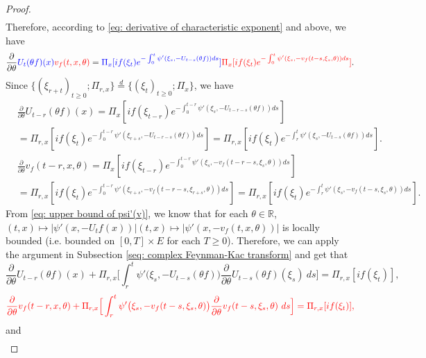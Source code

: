 \documentclass[12pt,oneside,english]{amsart}
\theoremstyle{plain}
\theoremstyle{definition}
\numberwithin{equation}{section}
\newcommand{\added}[1]{{\color{blue}#1}}\newcommand{\deleted}[1]{{\color{red}#1}}
\begin{document}
\begin{proof}
\begin{align}
\end{align}
    Therefore, according to \eqref{eq: derivative of characteristic exponent} and above, we have
\begin{align}
    \frac{\partial}{\partial \theta} \added{U_t(\theta f)(x)}\deleted{v_f(t, x, \theta) }   
    = \added{ \Pi_x[ if(\xi_t) e^{ - \int_0^t \psi'(\xi_s, -U_{t-s}(\theta f)) ds} ]}\deleted{ \Pi_x[ if(\xi_t) e^{ - \int_0^t \psi'(\xi_s, -v_f(t-s,\xi_s,\theta)) ds} ]}.
\end{align}
    Since $\{(\xi_{r+t})_{t \geq 0}; \Pi_{r,x}\} \overset{d}{=} \{(\xi_{t})_{t\geq 0}; \Pi_{x}\} $, we have
\deleted{
\begin{align}
    &\frac{\partial}{\partial \theta} U_{t-r}(\theta f)( x)
    = \Pi_x[ i f(\xi_{t-r}) e^{-\int_0^{t-r} \psi'(\xi_s, -U_{t-r-s}(\theta f)) ds} ]
    \\&= \Pi_{r,x}[i f(\xi_t)e^{-\int_0^{t-r} \psi'(\xi_{r+s}, -U_{t-r-s}(\theta f)) ds} ]
    = \Pi_{r,x}[if(\xi_t)e^{-\int_r^t \psi'(\xi_{s}, -U_{t-s}(\theta f)) ds} ].
\end{align}}
\deleted{
\begin{align}
    &\frac{\partial}{\partial \theta} v_f(t - r, x, \theta)
    = \Pi_x[ if(\xi_{t-r}) e^{-\int_0^{t-r} \psi'(\xi_s, -v_f(t-r-s,\xi_s,\theta)) ds} ]
    \\&= \Pi_{r,x}[if(\xi_t)e^{-\int_0^{t-r} \psi'(\xi_{r+s}, -v_f(t-r-s,\xi_{r+s},\theta)) ds} ]
    = \Pi_{r,x}[if(\xi_t)e^{-\int_r^t \psi'(\xi_{s}, -v_f(t-s,\xi_{s},\theta)) ds} ].
\end{align}
}
    From \eqref{eq: upper bound of psi'(v)}, we know that for each $\theta\in \mathbb R$, \added{$(t,x) \mapsto |\psi'(x,-U_tf(x))|$}\deleted{$(t,x) \mapsto |\psi'(x,-v_f(t,x,\theta))|$} is locally bounded (i.e. bounded on $[0,T]\times E$ for each $T \geq 0$).
    Therefore, we can apply the argument in Subsection \ref{seq: complex Feynman-Kac transform} and get that
\deleted{
\[
    \frac{\partial}{\partial \theta} U_{t-r}(\theta f)(x) + \Pi_{r,x} \Big[\int_r^t \psi'\big(\xi_s,- U_{t-s}(\theta f)\big)\frac{\partial}{\partial \theta} U_{t-s}(\theta f)(\xi_s)~ds\Big]
    = \Pi_{r,x} [i f(\xi_t)],
\]}
\begin{equation}
    \deleted{\frac{\partial}{\partial \theta} v_f(t-r, x, \theta) + \Pi_{r,x} \Big[\int_r^t \psi'\big(\xi_s,- v_f(t-s,\xi_s,\theta)\big)\frac{\partial}{\partial \theta} v_f(t-s, \xi_s, \theta)~ds\Big]
    = \Pi_{r,x} [i f(\xi_t)],}
\end{equation}
    and
\deleted{
\begin{align}

\end{align}}
\end{proof}
\end{document}
